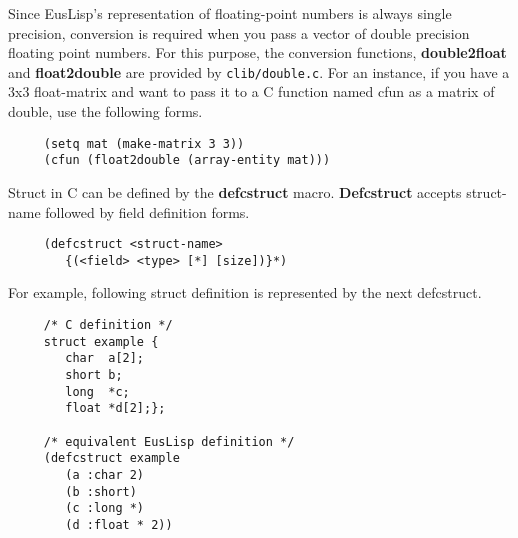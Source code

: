 Since EusLisp's representation of floating-point numbers is always single
precision, conversion is required when you pass a vector of double precision
floating point numbers.
For this purpose, the conversion functions,
{\bf double2float} and {\bf float2double} are provided
by {\tt clib/double.c}.
For an instance, if you have a 3x3 float-matrix and want to pass it to a C
function named cfun as a matrix of double, use the following forms.
\begin{verbatim}
     (setq mat (make-matrix 3 3))
     (cfun (float2double (array-entity mat)))
\end{verbatim}

Struct in C can be defined by the {\bf defcstruct} macro.
{\bf Defcstruct} accepts struct-name followed by 
field definition forms.

\begin{verbatim}
     (defcstruct <struct-name>
        {(<field> <type> [*] [size])}*)
\end{verbatim}
For example, following struct definition is represented by the next defcstruct.
\begin{verbatim}
     /* C definition */
     struct example {
        char  a[2];
        short b;
        long  *c;
        float *d[2];};

     /* equivalent EusLisp definition */
     (defcstruct example
        (a :char 2)
        (b :short)
        (c :long *)
        (d :float * 2))
\end{verbatim}

